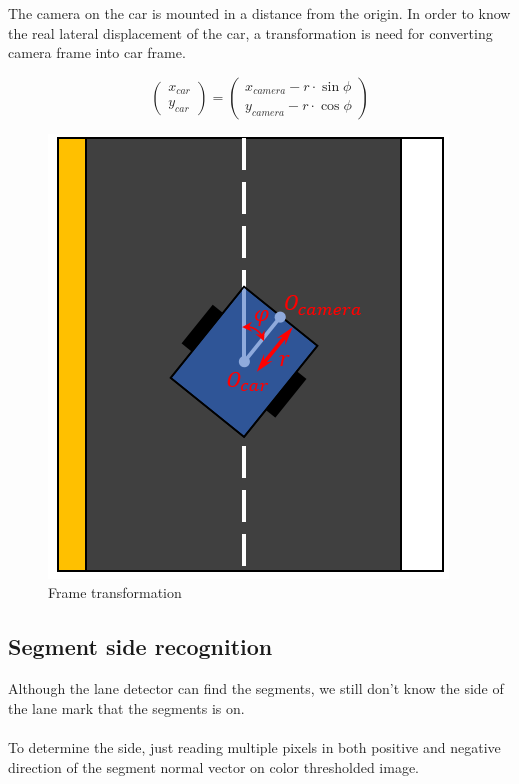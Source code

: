 \documentclass{article}
\begin{document}
The camera on the car is mounted in a distance from the origin. In order to know the real lateral displacement of the car, a transformation is need for converting camera frame into car frame.

\[
\begin{pmatrix} x_{car} \\ y_{car} \end{pmatrix} = 
\begin{pmatrix} x_{camera} - r \cdot \sin\phi \\ y_{camera} - r \cdot \cos\phi \end{pmatrix}
\]

\begin{figure}[ht]
  \label{fig:frame_transformation}
  \centering
  \includegraphics[scale=0.7]{graphs/frame_transformation.PNG}
  \caption{Frame transformation}
\end{figure}
\FloatBarrier

\subsection{Segment side recognition}

Although the lane detector can find the segments, we still don't know the side of the lane mark that the segments is on.
\\
\\
To determine the side, just reading multiple pixels in both positive and negative direction of the segment normal vector on color thresholded image. 
\end{document}
